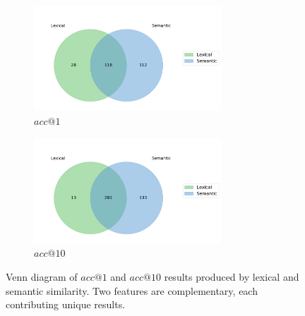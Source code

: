\documentclass[sigconf]{acmart}
\begin{document}
\begin{figure}[ht]
  \centering
  \begin{subfigure}{0.4\textwidth}
    \includegraphics[width=70mm]{images/2_features_acc1.pdf}
    \caption{$acc@1$\label{fig:venn_2_1}}
  \end{subfigure}
  \hspace{1em}
  \begin{subfigure}{0.4\textwidth}
    \includegraphics[width=70mm]{images/2_features_acc10.pdf}
    \caption{$acc@10$\label{fig:venn_2_10}}
  \end{subfigure}
  \caption{Venn diagram of $acc@1$ and $acc@10$ results produced by lexical and semantic similarity. Two features are complementary, each contributing unique results.\label{fig:venn_2}}
\end{figure}
\end{document}
